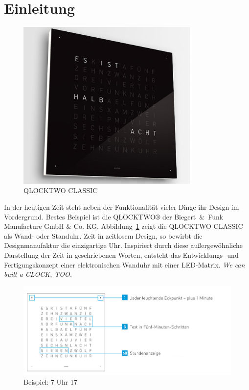 
\section{Einleitung}
\label{sec:Einleitung}

\begin{figure}[t]
    \centering
    \includegraphics[width=9cm]{Abbildungen/qlocktwo-wand}
    \caption[QlockTwo]{QLOCKTWO CLASSIC}
    \label{fig:QlockTwo}
\end{figure}
%
 \begin{multicols}{2}
 In der heutigen Zeit steht neben der Funktionalität vieler Dinge ihr Design im Vordergrund. Bestes Beispiel ist die QLOCKTWO® der Biegert~\&~Funk Manufacture GmbH \& Co. KG. Abbildung~\ref{fig:QlockTwo} zeigt die QLOCKTWO CLASSIC als Wand- oder Standuhr. %
 Zeit in zeitlosem Design, so bewirbt die Designmanufaktur die einzigartige Uhr.  Inspiriert durch diese außergewöhnliche Darstellung der Zeit in geschriebenen Worten, entsteht das Entwicklungs- und Fertigungskonzept einer elektronischen Wanduhr mit einer LED-Matrix. \textit{We can built a CLOCK, TOO.}
 \end{multicols}
 \begin{figure}[h]
    \centering
    \includegraphics[width=13cm]{Abbildungen/Uhrzeit_Beispiel}
    \caption[Uhrzeit_Bspl]{Beispiel: 7 Uhr 17}
    \label{fig:Uhrzeit_Bspl}
\end{figure}
